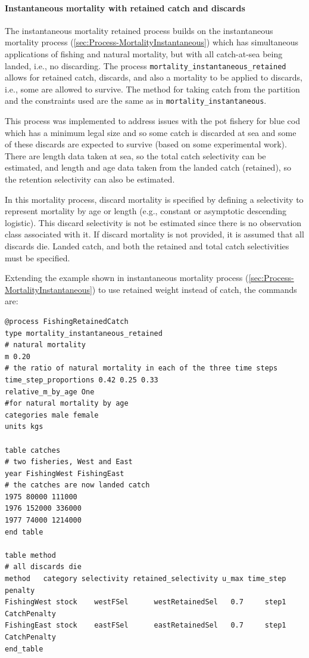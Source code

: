 \paragraph{Instantaneous mortality with retained catch and discards}\label{sec:Process-MortalityInstantaneousRetained}

The instantaneous mortality retained process builds on the instantaneous mortality process (\ref{sec:Process-MortalityInstantaneous}) which has simultaneous applications of fishing and natural mortality, but with all catch-at-sea being landed, i.e., no discarding. The process \texttt{mortality\_instantaneous\_retained} allows for retained catch, discards, and also a mortality to be applied to discards, i.e., some are allowed to survive. The method for taking catch from the partition and the constraints used are the same as in \texttt{mortality\_instantaneous}.

This process was implemented to address issues with the pot fishery for blue cod which has a minimum legal size and so some catch is discarded at sea and some of these discards are expected to survive (based on some experimental work). There are length data taken at sea, so the total catch selectivity can be estimated, and length and age data taken from the landed catch (retained), so the retention selectivity can also be estimated.

In this mortality process, discard mortality is specified by defining a selectivity to represent mortality by age or length (e.g., constant or asymptotic descending logistic).  This discard selectivity is not be estimated since there is no observation class associated with it. If discard mortality is not provided, it is assumed that all discards die. Landed catch, and both the retained and total catch selectivities must be specified.

Extending the example shown in instantaneous mortality process (\ref{sec:Process-MortalityInstantaneous}) to use retained weight instead of catch, the commands are:

{\small{\begin{verbatim}
@process FishingRetainedCatch
type mortality_instantaneous_retained
# natural mortality
m 0.20
# the ratio of natural mortality in each of the three time steps
time_step_proportions 0.42 0.25 0.33
relative_m_by_age One
#for natural mortality by age
categories male female
units kgs

table catches
# two fisheries, West and East
year FishingWest FishingEast
# the catches are now landed catch
1975 80000 111000
1976 152000 336000
1977 74000 1214000
end table

table method
# all discards die
method   category selectivity retained_selectivity u_max time_step      penalty
FishingWest stock    westFSel      westRetainedSel   0.7     step1 CatchPenalty
FishingEast stock    eastFSel      eastRetainedSel   0.7     step1 CatchPenalty
end_table
\end{verbatim}}}

